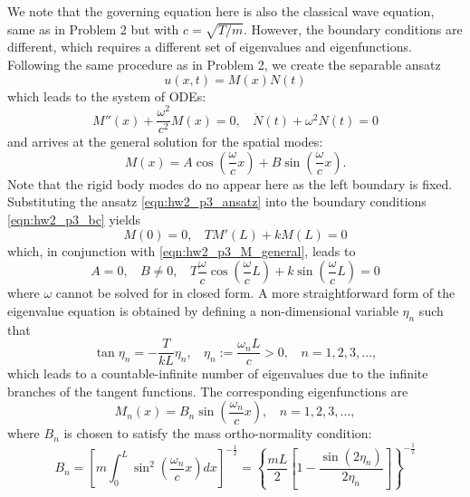 We note that the governing equation here is also the classical wave equation, same as in Problem 2 but with $c = \sqrt{T / m}$. 
However, the boundary conditions are different, which requires a different set of eigenvalues and eigenfunctions.
Following the same procedure as in Problem 2, we create the separable ansatz 
\begin{equation}\label{eqn:hw2_p3_ansatz}
    u(x, t) = M(x) N(t)
\end{equation}
which leads to the system of ODEs:
\begin{equation}\label{eqn:hw2_p3_separated}
    M''(x) + \frac{\omega^2}{c^2} M(x) = 0, ~~~~ \ddot{N}(t) + \omega^2 N(t) = 0
\end{equation}
and arrives at the general solution for the spatial modes:
\begin{equation}\label{eqn:hw2_p3_M_general}
    M(x) = A \cos\left(\frac{\omega}{c} x\right) + B \sin\left(\frac{\omega}{c} x\right).
\end{equation}
Note that the rigid body modes do no appear here as the left boundary is fixed. 
Substituting the ansatz \cref{eqn:hw2_p3_ansatz} into the boundary conditions \cref{eqn:hw2_p3_bc} yields
\begin{equation}\label{eqn:hw2_p3_bc_spatial}
    M(0) = 0, ~~~~ T M'(L) + k M(L) = 0
\end{equation}
which, in conjunction with \cref{eqn:hw2_p3_M_general}, leads to 
\begin{equation}
    A = 0, ~~~~ B \neq 0, ~~~~ T \frac{\omega}{c} \cos\left(\frac{\omega}{c} L\right) + k \sin\left(\frac{\omega}{c} L\right) = 0 
\end{equation}
where $\omega$ cannot be solved for in closed form. 
A more straightforward form of the eigenvalue equation is obtained by defining a non-dimensional variable $\eta_n$ such that 
\begin{equation}\label{eqn:hw2_p3_eigenvalue_eqn}
    \tan\eta_n = -\frac{T}{kL} \eta_n, ~~~~ \eta_n := \frac{\omega_n L}{c} > 0, ~~~~ n = 1, 2, 3, \ldots,
\end{equation}
which leads to a countable-infinite number of eigenvalues due to the infinite branches of the tangent functions. 
The corresponding eigenfunctions are
\begin{equation}\label{eqn:hw2_p3_eigenfunctions}
    \boxed{M_n(x) = B_n \sin\left(\frac{\omega_n}{c} x\right), ~~~~ n = 1, 2, 3, \ldots},
\end{equation}
where $B_n$ is chosen to satisfy the mass ortho-normality condition:
\begin{equation}
    B_n = {\left[m\int_0^L \sin^2\left(\frac{\omega_n}{c} x\right) dx \right]}^{-\frac{1}{2}} = { \left\{ \frac{mL}{2} \left[ 1 - \frac{\sin (2\eta_n)}{2\eta_n} \right] \right\} }^{-\frac{1}{2}} 
\end{equation}
